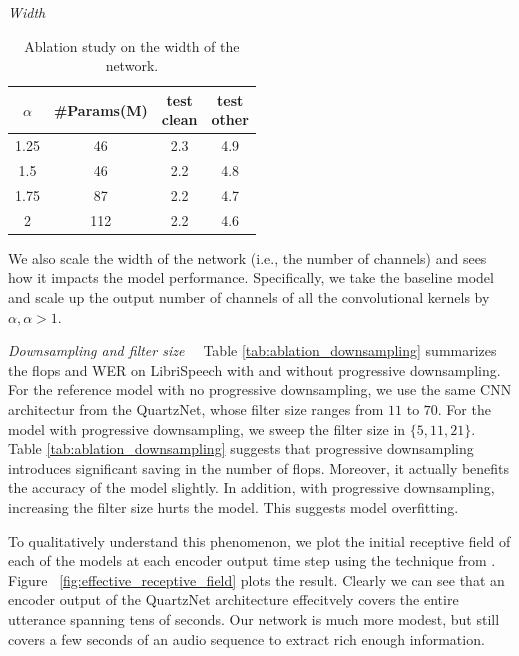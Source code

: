 \vspace{0.1in}
\noindent \textit{Width\ \ }

\begin{table}
\begin{centering}
\begin{tabular}{c|ccc}
\hline 
$\alpha$ & \#Params(M) & \makecell{test\\ clean} & \makecell{test\\ other} \\
\hline 
\hline 
1.25 & 46 & 2.3 & 4.9 \tabularnewline
1.5 & 46 & 2.2 & 4.8 \tabularnewline
1.75 & 87 & 2.2 & 4.7\tabularnewline
2 & 112 & 2.2 & 4.6\tabularnewline
\hline 
\end{tabular}
\par\end{centering}
\caption{Ablation study on the width of the network.}
\label{tab:ablation_depth}
\end{table}

We also scale the width of the network (i.e., the number of channels) and sees how it impacts the model performance. Specifically, we take the baseline model and scale up the output number of channels of all the convolutional kernels by $\alpha, \alpha > 1$. 

\vspace{0.1in}
\noindent
\textit{Downsampling and filter size\ \ }
Table \ref{tab:ablation_downsampling} summarizes the flops and WER on LibriSpeech with and without progressive downsampling. For the reference model with no progressive downsampling, we use the same CNN architectur from the QuartzNet, whose filter size ranges from $11$ to $70$. For the model with progressive downsampling, we sweep the filter size in $\{5, 11, 21\}$. Table \ref{tab:ablation_downsampling} suggests that progressive downsampling introduces significant saving in the number of flops. Moreover, it actually benefits the accuracy of the model slightly. In addition, with progressive downsampling, increasing the filter size hurts the model. This suggests model overfitting.

To qualitatively understand this phenomenon, we plot the initial receptive field of each of the models at each encoder output time step using the technique from \cite{luo2016understanding}. Figure ~\ref{fig:effective_receptive_field} plots the result. Clearly we can see that an encoder output of the QuartzNet architecture effecitvely covers the entire utterance spanning tens of seconds. Our network is much more modest, but still covers a few seconds of an audio sequence to extract rich enough information.

